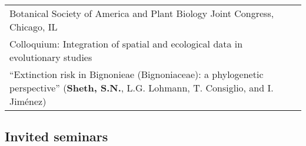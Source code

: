 \documentclass[11pt,english]{article}\usepackage[]{graphicx}\usepackage[]{color}
\providecommand{\tabularnewline}{\\}
\begin{document}
\renewcommand{\arraystretch}{1.2}
\begin{tabularx}{\textwidth}{@{}>{\raggedright}p{5.25in} >{\raggedleft}X@{}}

Botanical Society of America and Plant Biology Joint Congress, Chicago, IL & 2007 \tabularnewline
\addtolength{\leftskip}{5ex} Colloquium: Integration of spatial and ecological data in evolutionary studies \tabularnewline
\addtolength{\leftskip}{5ex} ``Extinction risk in Bignonieae (Bignoniaceae): a phylogenetic perspective'' (\textbf{Sheth, S.N.}, L.G. Lohmann, T. Consiglio, and I. Jim\'enez) \tabularnewline

\end{tabularx}
\vspace{-0.5ex}

\subsection*{Invited seminars}
\end{document}
